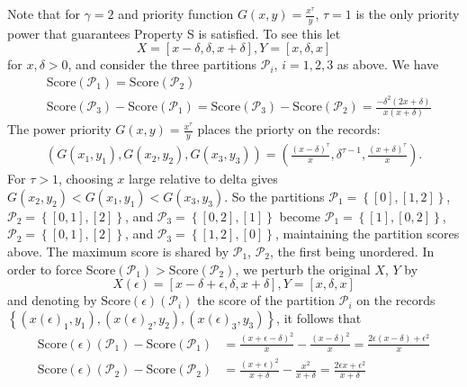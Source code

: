 \documentclass{article}
\theoremstyle{case}
\begin{document}
Note that for $\gamma = 2$ and priority function $G\left( x,y\right) = \frac{x^{\tau}}{y}$, $\tau = 1$ is the only priority power that guarantees Property S is satisfied. To see this let
\[
X = \left[ x-\delta, \delta, x + \delta\right], Y = \left[ x, \delta, x\right]
\] 
for $x, \delta > 0$, and consider the three partitions $\mathcal{P}_i$, $i=1, 2, 3$ as above. We have
\begin{align*}
& \text{Score}\left(\mathcal{P}_1\right) = \text{Score}\left(\mathcal{P}_2\right) \\
& \text{Score}\left(\mathcal{P}_3\right) - \text{Score}\left(\mathcal{P}_1\right) = \text{Score}\left(\mathcal{P}_3\right) - \text{Score}\left(\mathcal{P}_2\right) = \frac{-\delta^2\left( 2x + \delta\right)}{x\left( x + \delta\right)}
\end{align*}
The power priority $G(x,y) = \frac{x^\tau}{y}$ places the priorty on the records:
\begin{align} \label{eq8}
\left( G(x_1, y_1), G(x_2, y_2), G(x_3, y_3)\right) = \left( \frac{\left( x - \delta \right)^{\tau}}{x}, \delta^{\tau-1},  \frac{\left( x + \delta \right)^{\tau}}{x}\right).
\end{align}
For $\tau > 1$, choosing $x$ large relative to delta gives $G(x_2, y_2) < G(x_1, y_1) < G(x_3, y_3)$. So the partitions $\mathcal{P}_1 = \left\lbrace \left[ 0 \right], \left[ 1, 2\right]\right\rbrace$, $\mathcal{P}_2 = \left\lbrace \left[ 0, 1 \right], \left[ 2\right]\right\rbrace$, and $\mathcal{P}_3 = \left\lbrace \left[ 0, 2 \right], \left[ 1 \right]\right\rbrace$ become $\mathcal{P}_1 = \left\lbrace \left[ 1 \right], \left[ 0, 2\right]\right\rbrace$, $\mathcal{P}_2 = \left\lbrace \left[ 0, 1 \right], \left[ 2\right]\right\rbrace$, and $\mathcal{P}_3 = \left\lbrace \left[ 1, 2 \right], \left[ 0 \right]\right\rbrace$, maintaining the partition scores above. The maximum score is shared by $\mathcal{P}_1$, $\mathcal{P}_2$, the first being unordered. In order to force $\text{Score}\left(\mathcal{P}_1\right) > \text{Score}\left(\mathcal{P}_2\right)$, we perturb the original $X$, $Y$ by
\[
X\left(\epsilon\right) = \left[ x-\delta+\epsilon, \delta, x + \delta\right], Y = \left[ x, \delta, x\right]
\]
and denoting by $\text{Score}\left(\epsilon \right)\left(\mathcal{P}_i \right)$ the score of the partition $\mathcal{P}_i$ on the records $\left\lbrace \left(x\left(\epsilon\right)_1, y_1\right),\left(x\left(\epsilon\right)_2, y_2\right),\left(x\left(\epsilon\right)_3, y_3\right) \right\rbrace$, it follows that
\begin{align*}
\text{Score}\left(\epsilon \right)\left(\mathcal{P}_1 \right) - \text{Score}\left(\mathcal{P}_1 \right) &= \frac{\left( x + \epsilon - \delta\right)^2}{x} - \frac{\left( x - \delta\right)^2}{x} = \frac{2\epsilon\left( x - \delta\right) + \epsilon^2}{x} \\
\text{Score}\left(\epsilon \right)\left(\mathcal{P}_2 \right) - \text{Score}\left(\mathcal{P}_2 \right) &= \frac{\left( x + \epsilon\right)^2}{x + \delta}  - \frac{x^2}{x+\delta}= \frac{2\epsilon x + \epsilon^2}{x+\delta}
\end{align*}
\end{document}
